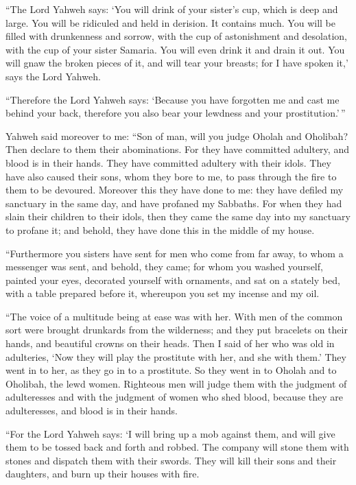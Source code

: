 \begin{paracol}{2}
\begin{otherlanguage}{english}
 ``The Lord Yahweh says: `You will drink of your sister's
cup, which is deep and large. You will be ridiculed and held in
derision. It contains much.  You will be filled with
drunkenness and sorrow, with the cup of astonishment and desolation,
with the cup of your sister Samaria.  You will even drink
it and drain it out. You will gnaw the broken pieces of it, and will
tear your breasts; for I have spoken it,' says the Lord Yahweh.

 ``Therefore the Lord Yahweh says: `Because you have
forgotten me and cast me behind your back, therefore you also bear your
lewdness and your prostitution.'\,''

 Yahweh said moreover to me: ``Son of man, will you judge
Oholah and Oholibah? Then declare to them their abominations.
 For they have committed adultery, and blood is in their
hands. They have committed adultery with their idols. They have also
caused their sons, whom they bore to me, to pass through the fire to
them to be devoured.  Moreover this they have done to me:
they have defiled my sanctuary in the same day, and have profaned my
Sabbaths.  For when they had slain their children to
their idols, then they came the same day into my sanctuary to profane
it; and behold, they have done this in the middle of my house.

 ``Furthermore you sisters have sent for men who come
from far away, to whom a messenger was sent, and behold, they came; for
whom you washed yourself, painted your eyes, decorated yourself with
ornaments,  and sat on a stately bed, with a table
prepared before it, whereupon you set my incense and my oil.

 ``The voice of a multitude being at ease was with her.
With men of the common sort were brought drunkards from the wilderness;
and they put bracelets on their hands, and beautiful crowns on their
heads.  Then I said of her who was old in adulteries,
`Now they will play the prostitute with her, and she with them.'
 They went in to her, as they go in to a prostitute. So
they went in to Oholah and to Oholibah, the lewd women. 
Righteous men will judge them with the judgment of adulteresses and with
the judgment of women who shed blood, because they are adulteresses, and
blood is in their hands.

 ``For the Lord Yahweh says: `I will bring up a mob
against them, and will give them to be tossed back and forth and robbed.
 The company will stone them with stones and dispatch
them with their swords. They will kill their sons and their daughters,
and burn up their houses with fire.


\end{otherlanguage}
\end{paracol}
